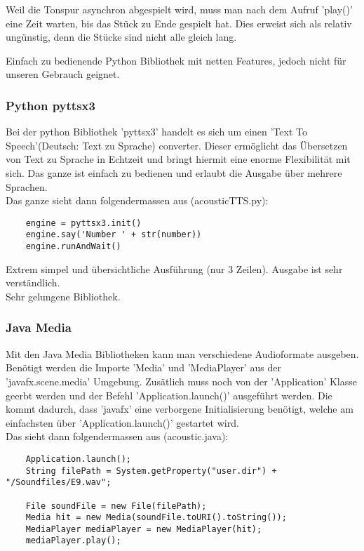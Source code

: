 \documentclass[../../main.tex]{subfiles}
\begin{document}
    Weil die Tonspur asynchron abgespielt wird, muss man nach dem Aufruf 'play()' eine Zeit warten, bis das Stück zu Ende gespielt hat.
    Dies erweist sich als relativ ungünstig, denn die Stücke sind nicht alle gleich lang.

    Einfach zu bedienende Python Bibliothek mit netten Features, jedoch nicht für unseren Gebrauch geignet.\\

    \subsubsection{Python pyttsx3}
    Bei der python Bibliothek 'pyttsx3' handelt es sich um einen 'Text To Speech'(Deutsch: Text zu Sprache) converter.
    Dieser ermöglicht das Übersetzen von Text zu Sprache in Echtzeit und bringt hiermit eine enorme Flexibilität mit sich.
    Das ganze ist einfach zu bedienen und erlaubt die Ausgabe über mehrere Sprachen.\\

    Das ganze sieht dann folgendermassen aus (acousticTTS.py):
    \begin{lstlisting}
    engine = pyttsx3.init()
    engine.say('Number ' + str(number))
    engine.runAndWait()
    \end{lstlisting}

    Extrem simpel und übersichtliche Ausführung (nur 3 Zeilen). Ausgabe ist sehr verständlich.\\
    Sehr gelungene Bibliothek.

    \subsubsection{Java Media}
    Mit den Java Media Bibliotheken kann man verschiedene Audioformate ausgeben.
    Benötigt werden die Importe 'Media' und 'MediaPlayer' aus der 'javafx.scene.media' Umgebung.
    Zusätlich muss noch von der 'Application' Klasse geerbt werden und der Befehl 'Application.launch()' ausgeführt werden.
    Die kommt dadurch, dass 'javafx' eine verborgene Initialisierung benötigt,
    welche am einfachsten über 'Application.launch()' gestartet wird.\\

    Das sieht dann folgendermassen aus (acoustic.java):
    \begin{lstlisting}
    Application.launch();
    String filePath = System.getProperty("user.dir") + "/Soundfiles/E9.wav";

    File soundFile = new File(filePath);
    Media hit = new Media(soundFile.toURI().toString());
    MediaPlayer mediaPlayer = new MediaPlayer(hit);
    mediaPlayer.play();
    \end{lstlisting}
\end{document}
